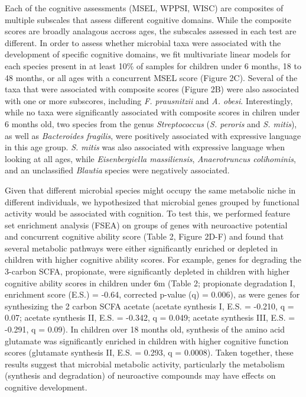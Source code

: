 \documentclass{article}
\begin{document}
Each of the cognitive assessments (MSEL, WPPSI, WISC)
are composites of multiple subscales that assess different cognitive domains.
While the composite scores are broadly analagous accross ages,
the subscales assessed in each test are different.
In order to assess whether microbial taxa were associated with
the development of specific cognitive domains,
we fit multivariate linear models for each species present in at least 10\%
of samples for children under 6 months, 18 to 48 months, or all ages
with a concurrent MSEL score (Figure 2C).
Several of the taxa that were associated with composite scores (Figure 2B)
were also associated with one or more subscores, including
\textit{F. prausnitzii} and \textit{A. obesi}.
Interestingly, while no taxa were significantly associated
with composite scores in chilren under 6 months old,
two species from the genus \textit{Streptococcus}
(\textit{S. peroris} and \textit{S. mitis}), as well as
\textit{Bacteroides fragilis}, were positively associated
with expressive language in this age group.
\textit{S. mitis} was also associated with expressive language
when looking at all ages, while \textit{Eisenbergiella massiliensis},
\textit{Anaerotruncus colihominis}, and an unclassified \textit{Blautia}
species were negatively associated. %


Given that different microbial species might occupy the same metabolic
niche in different individuals, we hypothesized that microbial genes
grouped by functional activity would be associated with cognition. To
test this, we performed feature set enrichment analysis (FSEA) on groups
of genes with neuroactive potential
\cite{valles-colomerNeuroactivePotentialHuman2019}
and concurrent cognitive ability score (Table 2, Figure 2D-F) and found that
several metabolic pathways were either significantly enriched or depleted in
children with higher cognitive ability scores.
For example, genes for degrading the 3-carbon SCFA, propionate,
were significantly depleted in children with higher cognitive ability
scores in children under 6m (Table 2; propionate degradation I,
enrichment score (E.S.) = -0.64, corrected p-value (q)
= 0.006), as were genes for synthesizing the 2 carbon SCFA acetate
(acetate synthesis I, E.S. = -0.210, q = 0.07; acetate synthesis
II, E.S. = -0.342, q = 0.049; acetate synthesis III, E.S. = -0.291, q = 0.09).
In children over 18 months old, synthesis of the amino acid
glutamate was significantly enriched in children with
higher cognitive function scores (glutamate synthesis II, E.S. = 0.293, 
q = 0.0008). Taken together, these results suggest that
microbial metabolic activity, particularly the metabolism (synthesis and
degradation) of neuroactive compounds may have effects on cognitive
development.
\end{document}
